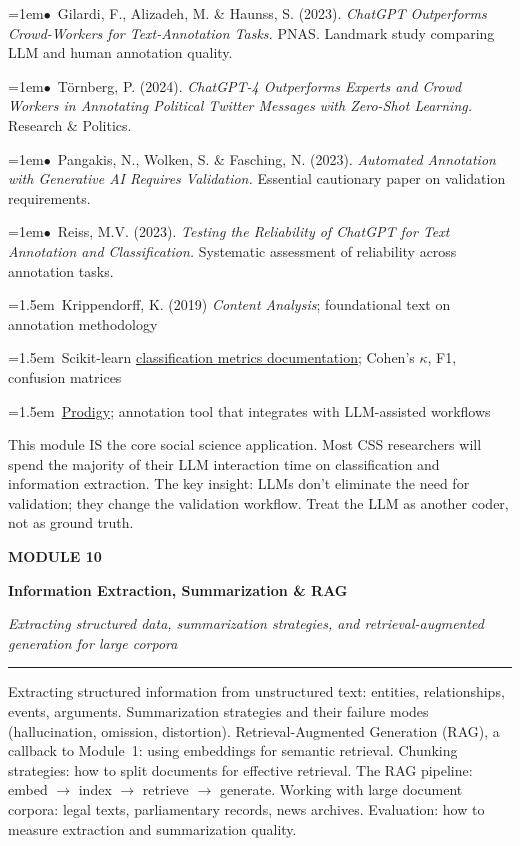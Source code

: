 \documentclass[11pt, a4paper]{article}
\newcommand{\modulehead}[3]{%
  \vspace{0.5em}
  {\small\sffamily\bfseries\textcolor{accent}{MODULE #1}}\par\vspace{-0.3em}
  {\Large\sffamily\bfseries\textcolor{dark}{#2}}\par\vspace{-0.2em}
  {\small\textit{\textcolor{muted}{#3}}}\par
  \vspace{0.2em}\textcolor{bordercol}{\rule{\textwidth}{0.3pt}}\par
}
\newcommand{\seclabel}[1]{%
  \vspace{0.6em}{\normalsize\sffamily\bfseries\textcolor{accent}{#1}}\par\vspace{0.2em}
}
\newcommand{\refpaper}[1]{%
  \par\hangindent=1em\hangafter=1\noindent\textcolor{accent}{\small$\bullet$}~{\small #1}\par
}
\newcommand{\resource}[1]{%
  \par\hangindent=1.5em\hangafter=1\noindent\hspace{0.5em}{\small\textcolor{accent}{\guilsinglright}}~{\small #1}\par
}
\begin{document}
\refpaper{Gilardi, F., Alizadeh, M. \& Haunss, S. (2023). \textit{ChatGPT Outperforms Crowd-Workers for Text-Annotation Tasks.} PNAS. Landmark study comparing LLM and human annotation quality.}

\refpaper{T\"ornberg, P. (2024). \textit{ChatGPT-4 Outperforms Experts and Crowd Workers in Annotating Political Twitter Messages with Zero-Shot Learning.} Research \& Politics.}

\refpaper{Pangakis, N., Wolken, S. \& Fasching, N. (2023). \textit{Automated Annotation with Generative AI Requires Validation.} Essential cautionary paper on validation requirements.}

\refpaper{Reiss, M.V. (2023). \textit{Testing the Reliability of ChatGPT for Text Annotation and Classification.} Systematic assessment of reliability across annotation tasks.}

\seclabel{Further Resources}

\resource{Krippendorff, K. (2019) \textit{Content Analysis}; foundational text on annotation methodology}

\resource{Scikit-learn \href{https://scikit-learn.org/stable/modules/model_evaluation.html}{classification metrics documentation}; Cohen's $\kappa$, F1, confusion matrices}

\resource{\href{https://prodi.gy}{Prodigy}; annotation tool that integrates with LLM-assisted workflows}

\begin{appblock}
This module IS the core social science application. Most CSS researchers will spend the majority of their LLM interaction time on classification and information extraction. The key insight: LLMs don't eliminate the need for validation; they change the validation workflow. Treat the LLM as another coder, not as ground truth.
\end{appblock}

\vspace{1.5em}

\newpage
\modulehead{10}{Information Extraction, Summarization \& RAG}{Extracting structured data, summarization strategies, and retrieval-augmented generation for large corpora}

\seclabel{Core Concepts}

Extracting structured information from unstructured text: entities, relationships, events, arguments. Summarization strategies and their failure modes (hallucination, omission, distortion). Retrieval-Augmented Generation (RAG), a callback to Module~1: using embeddings for semantic retrieval. Chunking strategies: how to split documents for effective retrieval. The RAG pipeline: embed $\rightarrow$ index $\rightarrow$ retrieve $\rightarrow$ generate. Working with large document corpora: legal texts, parliamentary records, news archives. Evaluation: how to measure extraction and summarization quality.
\end{document}
